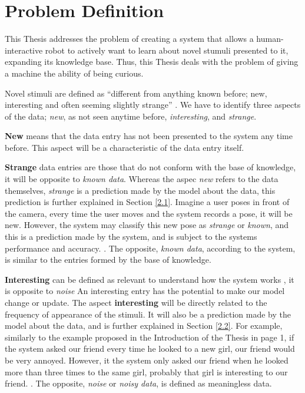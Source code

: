 
\chapter{Problem Definition} %

\label{Chapter2} %


This Thesis addresses the problem of creating a system that allows a human-interactive robot to actively want to learn about novel stumuli presented to it, expanding its knowledge base. Thus, this Thesis deals with the problem of giving a machine the ability of being curious.

Novel stimuli are defined as “different from anything known before; new, interesting and often seeming slightly strange” \cite{Pimentel2014}. We have to identify three aspects of the data; \emph{new}, as not seen anytime before, \emph{interesting}, and \emph{strange}. 

\textbf{New} means that the data entry has not been presented to the system any time before. This aspect will be a characteristic of the data entry itself. \label{new}

\textbf{Strange} data entries are those that do not conform with the base of knowledge, it will be opposite to \emph{known data}. Whereas the aspec \emph{new} refers to the data themselves, \emph{strange} is a prediction made by the model about the data, this prediction is further explained in Section \ref{2.1}. 
Imagine a user poses in front of the camera, every time the user moves and the system records a pose, it will be new. However, the system may classify this new pose as \emph{strange} or \emph{known}, and this is a prediction made by the system, and is subject to the systems performance and accuracy. \label{strange}. The opposite, \emph{known data}, according to the system, is similar to the entries formed by the base of knowledge.

\textbf{Interesting} can be defined as relevant to understand how the system works \cite{Chandola2009}, it is opposite to \emph{noise} An interesting entry has the potential to make our model change or update. The aspect \textbf{interesting} will be directly related to the frequency of appearance of the stimuli. It will also be a prediction made by the model about the data, and  is further explained in Section \ref{2.2}.  For example, similarly to the example proposed in the Introduction of the Thesis in page 1, if the system asked our friend every time he looked to a new girl, our friend would be very annoyed. However, it the system only asked our friend when he looked more than three times to the same girl, probably that girl is interesting to our friend. \label{interesting}. The opposite, \emph{noise} or \emph{noisy data}, is defined as meaningless data.

